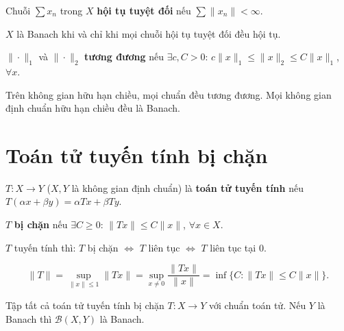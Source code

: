 \documentclass[12pt,a4paper]{article}
\begin{document}
\begin{dinhnghia}[title={Chuỗi trong không gian Banach}]
  Chuỗi $\sum x_n$ trong $X$ \textbf{hội tụ tuyệt đối} nếu $\sum \|x_n\| < \infty$.
\end{dinhnghia}

\begin{dinhly}
  $X$ là Banach khi và chỉ khi mọi chuỗi hội tụ tuyệt đối đều hội tụ.
\end{dinhly}

\begin{dinhnghia}[title={Chuẩn tương đương}]
  $\|\cdot\|_1$ và $\|\cdot\|_2$ \textbf{tương đương} nếu $\exists c, C > 0$: $c\|x\|_1 \le \|x\|_2 \le C\|x\|_1$, $\forall x$.
\end{dinhnghia}

\begin{dinhly}
  Trên không gian hữu hạn chiều, mọi chuẩn đều tương đương. Mọi không gian định chuẩn hữu hạn chiều đều là Banach.
\end{dinhly}

\section{Toán tử tuyến tính bị chặn}

\begin{dinhnghia}
  $T: X \to Y$ ($X, Y$ là không gian định chuẩn) là \textbf{toán tử tuyến tính} nếu $T(\alpha x + \beta y) = \alpha Tx + \beta Ty$.

  $T$ \textbf{bị chặn} nếu $\exists C \ge 0$: $\|Tx\| \le C\|x\|$, $\forall x \in X$.
\end{dinhnghia}

\begin{dinhly}
  $T$ tuyến tính thì: $T$ bị chặn $\Leftrightarrow$ $T$ liên tục $\Leftrightarrow$ $T$ liên tục tại $0$.
\end{dinhly}

\begin{dinhnghia}[title={Chuẩn toán tử}]
  \[
    \|T\| = \sup_{\|x\| \le 1} \|Tx\| = \sup_{x \ne 0} \frac{\|Tx\|}{\|x\|} = \inf\{C : \|Tx\| \le C\|x\|\}.
  \]
\end{dinhnghia}

\begin{dinhnghia}[title={Không gian $\mathcal{B}(X, Y)$}]
  Tập tất cả toán tử tuyến tính bị chặn $T: X \to Y$ với chuẩn toán tử. Nếu $Y$ là Banach thì $\mathcal{B}(X, Y)$ là Banach.
\end{dinhnghia}
\end{document}
